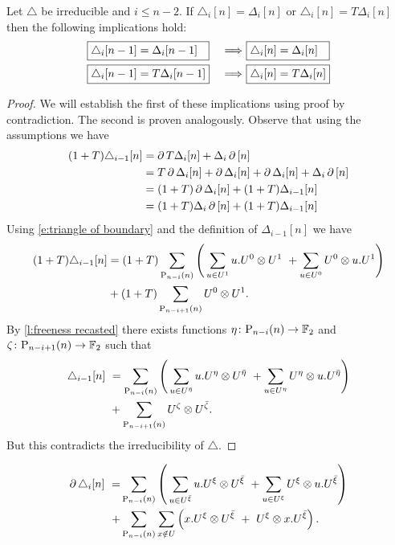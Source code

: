 \begin{lemma}
	Let $\triangle$ be irreducible and $i \leq n-2$.
	If $\triangle_i [n] = \Delta_i [n]$ or $\triangle_i [n] = T \Delta_i [n]$ then the following implications hold:
	\begin{alignat*}{2}
	&\boxed{\triangle_i [n-1] = \Delta_i [n-1] \hspace*{7pt}}\ &\Longrightarrow\
	&\boxed{\triangle_i [n] = \Delta_i [n] \hspace*{7pt}} \\
	&\boxed{\triangle_i [n-1] = T \Delta_i [n-1]}\ &\Longrightarrow\
	&\boxed{\triangle_i [n] = T \Delta_i [n]}
	\end{alignat*}
\end{lemma}

\begin{proof}
	We will establish the first of these implications using proof by contradiction.
	The second is proven analogously.
	Observe that using the assumptions we have
	\begin{align*}
	(1+T) \triangle_{i-1}[n] &=
	\operatorname{\partial} T \Delta_i [n] + \Delta_i \operatorname{\partial} \, [n] \\ &=
	T \operatorname{\partial} \Delta_i [n] + \operatorname{\partial} \Delta_i [n] + \operatorname{\partial} \Delta_i [n] + \Delta_i \operatorname{\partial} \, [n] \\ &=
	(1+T) \operatorname{\partial} \Delta_i [n] + (1+T) \Delta_{i-1} [n] \\ &=
	(1+T) \Delta_i \operatorname{\partial} \, [n] + (1+T) \Delta_{i-1} [n]
	\end{align*}
	Using \eqref{e:triangle of boundary} and the definition of $\Delta_{i-1} [n]$ we have
	\begin{align*}
	(1+T) \triangle_{i-1}[n] &=
	(1+T) \sum_{\mathrm{P}_{n-i}(n)} \left( \,
	\sum_{u \in U^1} {u.U^0} \otimes {U^1} \ +
	\sum_{u \in U^0} {U^0} \otimes {u.U^1} \right) \\ &+
	(1+T) \sum_{\mathrm{P}_{n-i+1}(n)} U^0 \otimes U^1.
	\end{align*}
	By \cref{l:freeness recasted} there exists functions $\eta \colon \mathrm{P}_{n-i}(n) \to {\mathbb{F}_2}$ and $\zeta \colon \mathrm{P}_{n-i+1}(n) \to {\mathbb{F}_2}$ such that
	\begin{align*}
	\triangle_{i-1}[n] \ &=
	\sum_{\mathrm{P}_{n-i}(n)} \left( \,
	\sum_{u \in U^{\bar{\eta}}} u.U^\eta \otimes U^{\bar{\eta}} \ +
	\sum_{u \in U^\eta} U^\eta \otimes u.U^{\bar{\eta}} \right) \\ &+
	\sum_{\mathrm{P}_{n-i+1}(n)} U^\zeta \otimes U^{\bar{\zeta}}.
	\end{align*}
	But this contradicts the irreducibility of $\triangle$.
\end{proof}

\begin{align*}
\label{equation: boundary of triangle}
\bd \triangle_i [n]\ = &
\sum_{\P_{n-i}(n)} \left( \, \sum_{u \in U^\barxi} u.U^\xi \ot U^\barxi \ +
\sum_{u \in U^\xi} U^\xi \ot u.U^\barxi \right) \\ + &
\sum_{\P_{n-i}(n)} \sum_{x \notin U} \left( x.U^\xi \ot U^\barxi \ +\ U^\xi \ot {x.U^\barxi} \right).
\end{align*}


